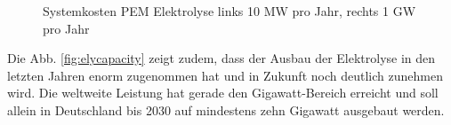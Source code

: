 \begin{figure}[t]
	\centering
	\qquad
	\caption{Systemkosten \gls{PEM} Elektrolyse links 10 MW pro Jahr, rechts 1 GW pro Jahr \cite{IRENA2020}}
	\label{fig:elycost}
\end{figure}
Die Abb. \ref{fig:elycapacity} zeigt zudem, dass der Ausbau der Elektrolyse in den letzten Jahren enorm zugenommen hat und in Zukunft noch deutlich zunehmen wird. Die weltweite Leistung hat gerade den Gigawatt-Bereich erreicht und soll allein in Deutschland bis 2030 auf mindestens zehn Gigawatt ausgebaut werden.\\

